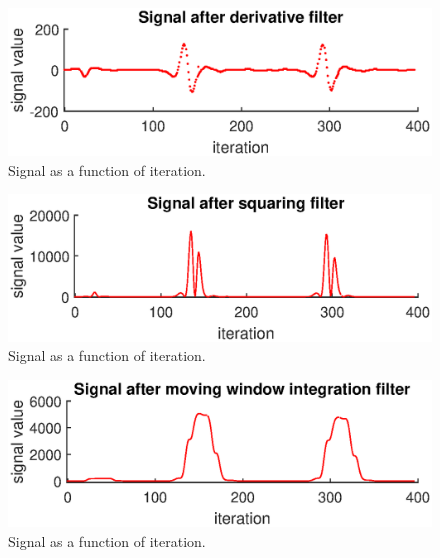 \begin{figure}[H]
    \centering
    \includegraphics[width=1.0\textwidth]{Appendix/fig/4afterDerivative.eps}
    \caption{Signal as a function of iteration.}
    \label{fig:4afterDerivative}
\end{figure}

\begin{figure}[H]
    \centering
    \includegraphics[width=1.0\textwidth]{Appendix/fig/5afterSquaring.eps}
    \caption{Signal as a function of iteration.}
    \label{fig:5afterSquaring}
\end{figure}


\begin{figure}[H]
    \centering
    \includegraphics[width=1.0\textwidth]{Appendix/fig/6afterMovInt.eps}
    \caption{Signal as a function of iteration.}
    \label{fig:6afterMovInt}
\end{figure}


